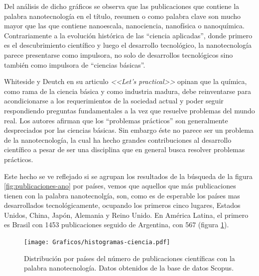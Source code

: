 	Del análisis de dicho gráficos se observa que las publicaciones que contiene la palabra nanotecnología en el título, resumen o como palabra clave son mucho mayor que las que contiene nanoescala, nanociencia, nanofísica o nanoquímica. Contrariamente a la evolución histórica de las ``ciencia aplicadas'', donde primero es el descubrimiento científico y luego el desarrollo tecnológico, la nanotecnología parece presentarse como impulsora, no solo de desarrollos tecnológicos sino también como impulsora de ``ciencias básicas''.

	Whiteside y Deutch en su articulo \textit{<<Let's practical>>} opinan que la química, como rama de la ciencia básica y como industria madura, debe reinventarse para acondicionarse a los requerimientos de la sociedad actual y poder seguir respondiendo preguntas fundamentales a la vez que resuelve problemas del mundo real. Los autores afirman que los ``problemas prácticos'' son generalmente despreciados por las ciencias básicas. \cite{Burdass2010} Sin embargo éste no parece ser un problema de la nanotecnología, la cual ha hecho grandes contribuciones al desarrollo científico a pesar de ser una disciplina que en general busca resolver problemas prácticos.
	
	Este hecho se ve reflejado si se agrupan los resultados de la búsqueda de la figura \ref{fig:publicaciones-ano} por países, vemos que aquellos que más publicaciones tienen con la palabra nanotecnolgía, son, como es de esperable los países mas desarrollados tecnológicamente, ocupando los primeros cinco lugares, Estados Unidos, China, Japón, Alemania y Reino Unido. En América Latina, el primero es Brasil con 1453 publicaciones seguido de Argentina, con 567 (figura \ref{fig:paises}).

			\begin{figure}[ht!]
 				\vspace*{-0.4cm}
 				\begin{center}
 				\texttt{[image: Graficos/histogramas-ciencia.pdf]}
 				\vspace*{-0.4cm}
 				\caption[Nanotecnología por países]{Distribución por países del número de publicaciones científicas con la palabra nanotecnología. Datos obtenidos de la base de datos Scopus.}
 				\label{fig:paises}
 		    	\end{center}
 		    	\end{figure}

